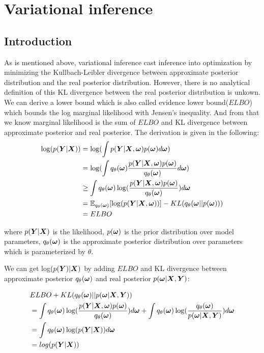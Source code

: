 \section{Variational inference}
\subsection{Introduction}
As is mentioned above, variational inference cast inference into optimization by minimizing the Kullbach-Leibler divergence between approximate posterior distribution and the real posterior distribution. However, there is no analytical definition of this KL divergence between the real posterior distribution is unkown. We can derive a lower bound which is also called evidence lower bound($ELBO$) which bounds the log marginal likelihood with Jensen's inequality. And from that we know marginal likelihood is the sum of $ELBO$ and KL divergence between approximate posterior and real posterior. The derivation is given in the following:
\begin{equation}\label{2.6}	
\begin{aligned}
	\log(p(\boldsymbol{Y}|\boldsymbol{X})) & = \log(\int p(\boldsymbol{Y}| \boldsymbol{X}, \boldsymbol{\omega})  p(\boldsymbol{\omega})d\boldsymbol{\omega}) \\	 
	& = \log(\int{q_{\theta}(\boldsymbol{\omega}) \frac{p(\boldsymbol{Y}| \boldsymbol{X}, \boldsymbol{\omega}) p(\boldsymbol{\omega})}{q_{\theta}(\boldsymbol{\omega})}d\boldsymbol{\omega}}) \\
	& \geq \int q_{\theta}(\boldsymbol{\omega}) \log( \frac{p(\boldsymbol{Y}| \boldsymbol{X}, \boldsymbol{\omega}) p(\boldsymbol{\omega})}{q_{\theta}(\boldsymbol{\omega})}) d\boldsymbol{\omega} \\
	& = \mathbb E_{q_{\theta}(\boldsymbol{\omega})}[\log(p(\boldsymbol{Y}| \boldsymbol{X}, \boldsymbol{\omega}))] -  KL(q_{\theta}(\boldsymbol{\omega}||p(\boldsymbol{\omega})))\\
	& = ELBO
\end{aligned}
\end{equation}

where $p(\boldsymbol Y| \boldsymbol X)$ is the likelihood, $p(\boldsymbol \omega)$ is the prior distribution over model parameters, $q_{\theta}(\boldsymbol \omega)$ is the approximate posterior distribution over parameters which is parameterized by $\theta$.

We can get log$(p(\boldsymbol Y) | \boldsymbol X)$ by adding $ELBO$ and KL divergence between approximate posterior $q_{\theta}(\boldsymbol \omega)$ and real posterior $p(\boldsymbol \omega | \boldsymbol X, \boldsymbol Y)$:

\begin{equation}\label{2.7}	
\begin{aligned}
 & ELBO + KL(q_{\theta}(\boldsymbol{\omega}) || p(\boldsymbol{\omega}|\boldsymbol{X}, \boldsymbol{Y})) \\ 
 & = \int q_{\theta}(\boldsymbol{\omega}) \log( \frac{p(\boldsymbol{Y}| \boldsymbol{X}, \boldsymbol{\omega}) p(\boldsymbol{\omega})}{q_{\theta}(\boldsymbol{\omega})}) d\boldsymbol{\omega} + \int q_{\theta}(\boldsymbol{\omega}) \log(\frac{q_{\theta}(\boldsymbol{\omega})}{p(\boldsymbol{\omega}|\boldsymbol{X}, \boldsymbol{Y})}) d\boldsymbol{\omega} \\
 & = \int q_{\theta}(\boldsymbol{\omega}) \log(p(\boldsymbol{Y} | \boldsymbol{X}))d\boldsymbol{\omega}\\
 & = log(p(\boldsymbol{Y}|\boldsymbol{X})) 
\end{aligned}
\end{equation}

